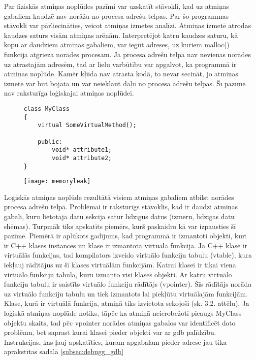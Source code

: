 Par fiziskās atmiņas noplūdes pazīmi var uzskatīt stāvokli, kad uz atmiņas gabaliem kaudzē nav norāžu no procesa adrešu telpas.
Par šo programmas stāvokli var pārliecināties, veicot atmiņas izmetes analīzi.
Atmiņas izmetē atrodas kaudzes saturs visām atmiņas arēnām.
Interpretējot katru kaudzes saturu, kā kopu ar daudziem atmiņas gabaliem, var iegūt adreses, uz kuriem malloc() funkcija atgrieza norādes procesam.
Ja procesa adrešu telpā nav nevienas norādes uz atrastajām adresēm, tad ar lielu varbūtību var apgalvot, ka programmā ir atmiņas noplūde.
Kamēr kļūda nav atrasta kodā, to nevar secināt, jo atmiņas izmete var būt bojāta un var neiekļaut daļu no procesa adrešu telpas.
Šī pazīme nav raksturīga loģiskajai atmiņas noplūdei.


\begin{figure}[h]
\begin{lstlisting}
class MyClass
{
    virtual SomeVirtualMethod();

    public:
        void* attribute1;
        void* attribute2;
}
\end{lstlisting}
\end{figure}
\begin{figure}[h]
\begin{center}
\texttt{[image: memoryleak]}
\end{center}
\caption{\textbf{\fontsize{11}{12}\selectfont {C++ klases ar virtuālo funkciju izvietojums atmiņā }}}
\label{fig:memoryleak}
\end{figure}

Loģiskās atmiņas noplūde rezultātā visiem atmiņas gabaliem atbilst norādes procesa adrešu telpā.
Problēmai ir raksturīgs stāvoklis, kad ir daudzi atmiņas gabali, kuru lietotāja datu sekcija satur līdzīgus datus (izmēru, līdzīgas datu shēmas).
Turpmāk tiks apskatīts piemērs, kurš paskaidro kā var izpausties šī pazīme.
Piemērā ir aplūkots gadījums, kad programmā ir izmantoti objekti, kuri ir  C++ klases instances un klasē ir izmantota virtuālā funkcija.
Ja C++ klasē ir virtuālās funkcijas, tad kompilators izveido virtuālo funkciju tabulu (vtable), kura iekļauj rādītājus uz šī klases virtuālām funkcijām.
 Katrai klasei ir tikai viena virtuālo funkciju tabula, kuru izmanto visi klases objekti.
 Ar katru virtuālo funkciju tabulu ir saistīts virtuālo funkciju rādītājs (vpointer).
 Šīs rādītājs norāda uz virtuālo funkciju tabulu un tiek izmantots lai piekļūtu virtuālajām funkcijām.
Klase, kurā ir virtuālā funkcija, atmiņā tiks izvietota sekojoši (sk. 3.2. attēlu).
Ja loģiskā atmiņas noplūde notiks, tāpēc ka atmiņā neierobežoti pieaugs MyClass objektu skaits, tad pēc vpointer norādes atmiņas gabalos var identificēt doto problēmu, bet saprast kurai klasei pieder objekti var ar gdb palīdzību.
Instrukcijas, kas ļauj apskatīties, kuram apgabalam pieder adrese jau tika aprakstītas sadaļā \ref{subsec:debugg_gdb}


